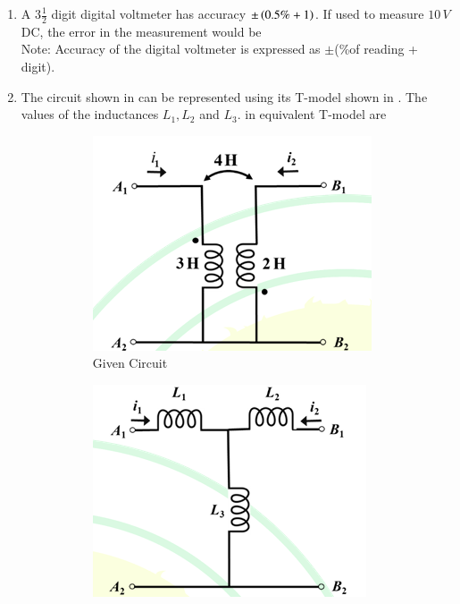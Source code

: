 \documentclass[journal,12pt,onecolumn]{IEEEtran}
\theoremstyle{remark}
\begin{document}
\begin{enumerate}
\item A $3\frac{1}{2}$ digit digital voltmeter has accuracy $\pm\left(0.5\% + 1\right)$. If used to measure $10\, V$ DC, the error in the measurement would be\\
Note: Accuracy of the digital voltmeter is expressed as $\pm$(\%of reading + digit). 
\begin{enumerate}
\end{enumerate}

\item The circuit shown in  can be represented using its T-model shown in . The values of the inductances $L_1,L_2$ and $L_3$. in equivalent T-model are \par\hfill{}
\begin{figure}[H]
\centering
\begin{subfigure}{.5\columnwidth}
  \centering
  \includegraphics[width=.6\columnwidth]{Figs/Q-24(a).png}
  \caption{Given Circuit}
  \label{24(a)}
\end{subfigure}%
\begin{subfigure}{.5\columnwidth}
  \centering
  \includegraphics[width=.6\columnwidth]{Figs/Q-24(b).png}

\end{subfigure}
\end{figure}
\end{enumerate}
\end{document}
